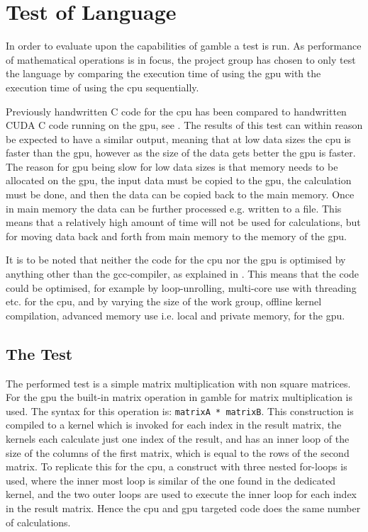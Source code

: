 \chapter{Test of Language} %
\label{cha:test_of_language}
In order to evaluate upon the capabilities of \gls{gamble} a test is run. 
As performance of mathematical operations is in focus, the project group has chosen to only test the language by comparing the execution time of using the \gls{gpu} with the execution time of using the \gls{cpu} sequentially.

Previously handwritten C code for the \gls{cpu} has been compared to handwritten CUDA C code running on the \gls{gpu}, see .
The results of this test can within reason be expected to have a similar output, meaning that at low data sizes the \gls{cpu} is faster than the \gls{gpu}, however as the size of the data gets better the \gls{gpu} is faster.
The reason for \gls{gpu} being slow for low data sizes is that memory needs to be allocated on the \gls{gpu}, the input data must be copied to the \gls{gpu}, the calculation must be done, and then the data can be copied back to the main memory. 
Once in main memory the data can be further processed e.g. written to a file. 
This means that a relatively high amount of time will not be used for calculations, but for moving data back and forth from main memory to the memory of the \gls{gpu}.

It is to be noted that neither the code for the \gls{cpu} nor the \gls{gpu} is optimised by anything other than the gcc-compiler, as explained in . 
This means that the code could be optimised, for example by loop-unrolling, multi-core use with threading etc. for the \gls{cpu}, and by varying the size of the work group, offline kernel compilation, advanced memory use i.e. local and private memory, for the \gls{gpu}.  

\section{The Test} %
\label{sec:the_test}
The performed test is a simple matrix multiplication with non square matrices.
For the \gls{gpu} the built-in matrix operation in \gls{gamble} for matrix multiplication is used. The syntax for this operation is: \texttt{matrixA * matrixB}. 
This construction is compiled to a kernel which is invoked for each index in the result matrix, the kernels each calculate just one index of the result, and has an inner loop of the size of the columns of the first matrix, which is equal to the rows of the second matrix.
To replicate this for the \gls{cpu}, a construct with three nested for-loops is used, where the inner most loop is similar of the one found in the dedicated kernel, and the two outer loops are used to execute the inner loop for each index in the result matrix.
Hence the \gls{cpu} and \gls{gpu} targeted code does the same number of calculations.
 
